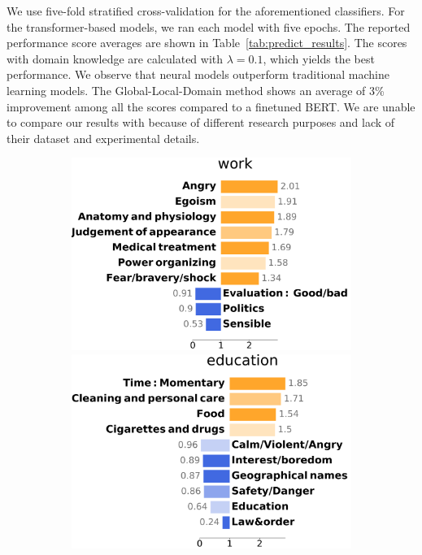 \documentclass[letterpaper]{article} %
\begin{document}
We use five-fold stratified cross-validation for the aforementioned classifiers.
For the transformer-based models, we ran each model with five epochs.
The reported performance score averages are shown in Table~\ref{tab:predict_results}.
The scores with domain knowledge are calculated with $\lambda=0.1$, which yields the best performance.
We observe that neural models outperform traditional machine learning models.
The Global-Local-Domain method shows an average of 3\% improvement among all the scores compared to a finetuned BERT.
We are unable to compare our results with \citet{botzer-2022-analysis} because of different research purposes and lack of their dataset and experimental details.

\begin{figure}[!htb]
\centering
\begin{subfigure}[b]{\textwidth}
    \centering
    \includegraphics[scale=0.14]{figs/work.pdf}
    \includegraphics[scale=0.13]{figs/education.pdf}

\end{subfigure}
\end{figure}
\end{document}
